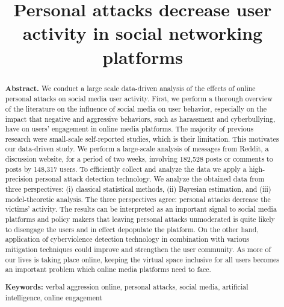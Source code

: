 \documentclass[
  10pt,
  dvipsnames]{scrartcl}
\title{Personal attacks decrease user activity in social networking
platforms}
\author{}
\date{\vspace{-2.5em}}
\begin{document}
\maketitle

\vspace{-2mm}

\begin{abstract}
\noindent \textbf{Abstract.} 
We conduct a large scale data-driven analysis of the effects of online personal attacks on social media user activity. First, we perform a thorough overview of the literature on the influence of social media on user behavior, especially on the impact that negative and aggressive behaviors, such as harassment and cyberbullying, have on users’ engagement in online media platforms. The majority of previous research were  small-scale self-reported studies, which is their limitation. This motivates our data-driven study. We perform a large-scale analysis of messages from Reddit, a discussion website, for a period of two weeks, involving 182,528 posts or comments to posts by 148,317 users. To efficiently collect and analyze the data we apply a high-precision personal attack detection technology. We analyze the obtained data from three perspectives: (i) classical statistical methods, (ii) Bayesian estimation, and (iii) model-theoretic analysis. The three perspectives agree: personal attacks decrease the victims’ activity.
The results can be interpreted as an important signal to social media platforms and policy makers that leaving personal attacks unmoderated is quite likely to disengage the users and in effect depopulate the platform. On the other hand, application of cyberviolence detection technology in combination with various mitigation techniques could improve and strengthen the user community. As more of our lives is taking place online, keeping the virtual space inclusive for all users becomes an important problem which online media platforms need to face.


\vspace{4mm}


\noindent \textbf{Keywords:} verbal aggression online, personal attacks, social media, artificial intelligence, online engagement



\vspace{4mm}



\end{abstract}
\end{document}
